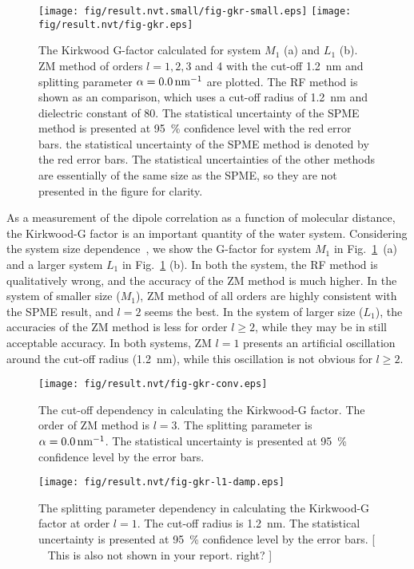 \documentclass[a4paper,preprint,unsortedaddress,onecolumn,fleqn]{revtex4}
\begin{document}
\begin{figure}[tbp]
\centering
\texttt{[image: fig/result.nvt.small/fig-gkr-small.eps]}\newline
\texttt{[image: fig/result.nvt/fig-gkr.eps]}
\caption{The Kirkwood G-factor calculated for system $M_{1}$ (a) and $L_{1} $
(b). ZM method of orders $l=1,2,3$ and 4 with the cut-off 1.2~nm and
splitting parameter $\protect\alpha =0.0\,\text{nm}^{-1}$ are plotted. The
RF method is shown as an comparison, which uses a cut-off radius of 1.2~nm
and dielectric constant of 80. The statistical uncertainty of the SPME
method is presented at 95~\% confidence level with the red error bars. the
statistical uncertainty of the SPME method is denoted by the red error bars.
The statistical uncertainties of the other methods are essentially of the
same size as the SPME, so they are not presented in the figure for clarity.}
\label{fig:gkr}
\end{figure}

As a measurement of the dipole correlation as a function of molecular
distance, the Kirkwood-G factor is an important quantity of the water
system. Considering the system size dependence~\cite{vanderSpoel2006origin},
we show the G-factor for system $M_{1}$ in Fig.~\ref{fig:gkr}~(a) and a
larger system $L_{1}$ in Fig.~\ref{fig:gkr} (b). In both the system, the RF
method is qualitatively wrong, and the accuracy of the ZM method is much
higher. In the system of smaller size ($M_{1}$), ZM method of all orders are
highly consistent with the SPME result, and $l=2$ seems the best. In the
system of larger size ($L_{1}$), the accuracies of the ZM method is less for
order $l\geq 2$, while they may be in still acceptable accuracy. In both
systems, ZM $l=1$ presents an artificial oscillation around the cut-off
radius (1.2~nm), while this oscillation is not obvious for $l\geq 2$.

\begin{figure}[tbp]
\centering
\texttt{[image: fig/result.nvt/fig-gkr-conv.eps]}
\caption{ The cut-off dependency in calculating the Kirkwood-G factor. The
order of ZM method is $l=3$. The splitting parameter is $\protect\alpha %
=0.0\,\text{nm}^{-1}$. The statistical uncertainty is presented at 95~\%
confidence level by the error bars. }
\label{fig:gkr-conv}
\end{figure}

\begin{figure}[tbp]
\centering
\texttt{[image: fig/result.nvt/fig-gkr-l1-damp.eps]}
\caption{ The splitting parameter dependency in calculating the Kirkwood-G
factor at order $l=1$. The cut-off radius is 1.2~nm. The statistical
uncertainty is presented at 95~\% confidence level by the error bars. [ {\ 
\color{blue} This is also not shown in your report. right? }]}
\label{fig:gkr-damp-l1}
\end{figure}
\end{document}
